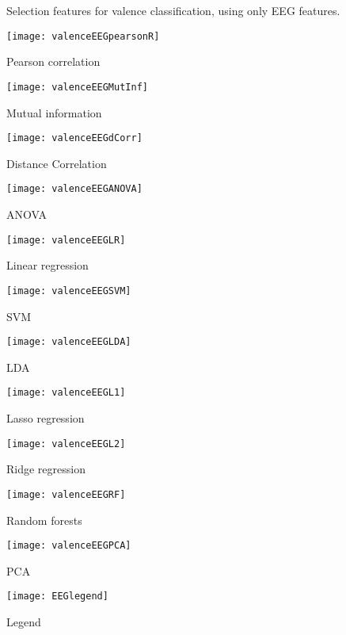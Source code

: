 \clearpage

\begin{figure}[!tbp]
  \centering
  \caption{Selection features for valence classification, using only EEG features.\label{valenceEEGpies}}
  \begin{minipage}[b]{0.3\textwidth}
    \texttt{[image: valenceEEGpearsonR]}
    \caption{Pearson correlation}
  \end{minipage}
  \hfill
  \begin{minipage}[b]{0.3\textwidth}
    \texttt{[image: valenceEEGMutInf]}
    \caption{Mutual information}
  \end{minipage}
  \hfill
  \begin{minipage}[b]{0.3\textwidth}
    \texttt{[image: valenceEEGdCorr]}
    \caption{Distance Correlation}
  \end{minipage}
  
  \begin{minipage}[b]{0.3\textwidth}
    \texttt{[image: valenceEEGANOVA]}
    \caption{ANOVA}
  \end{minipage}
  \hfill
  \begin{minipage}[b]{0.3\textwidth}
    \texttt{[image: valenceEEGLR]}
    \caption{Linear regression}
  \end{minipage}
  \hfill
  \begin{minipage}[b]{0.3\textwidth}
    \texttt{[image: valenceEEGSVM]}
    \caption{SVM}
  \end{minipage}
  
  \begin{minipage}[b]{0.3\textwidth}
    \texttt{[image: valenceEEGLDA]}
    \caption{LDA}
  \end{minipage}
  \hfill
  \begin{minipage}[b]{0.3\textwidth}
    \texttt{[image: valenceEEGL1]}
    \caption{Lasso regression}
  \end{minipage}
  \hfill
  \begin{minipage}[b]{0.3\textwidth}
    \texttt{[image: valenceEEGL2]}
    \caption{Ridge regression}
  \end{minipage}
  
  \begin{minipage}[b]{0.3\textwidth}
    \texttt{[image: valenceEEGRF]}
    \caption{Random forests}
  \end{minipage}
  \hfill
  \begin{minipage}[b]{0.3\textwidth}
    \texttt{[image: valenceEEGPCA]} %
    \caption{PCA}
  \end{minipage}
  \hfill
  \begin{minipage}[b]{0.3\textwidth}
    \texttt{[image: EEGlegend]}
    \caption{Legend\label{valencepieslegend}}
  \end{minipage}
\end{figure}
\clearpage


